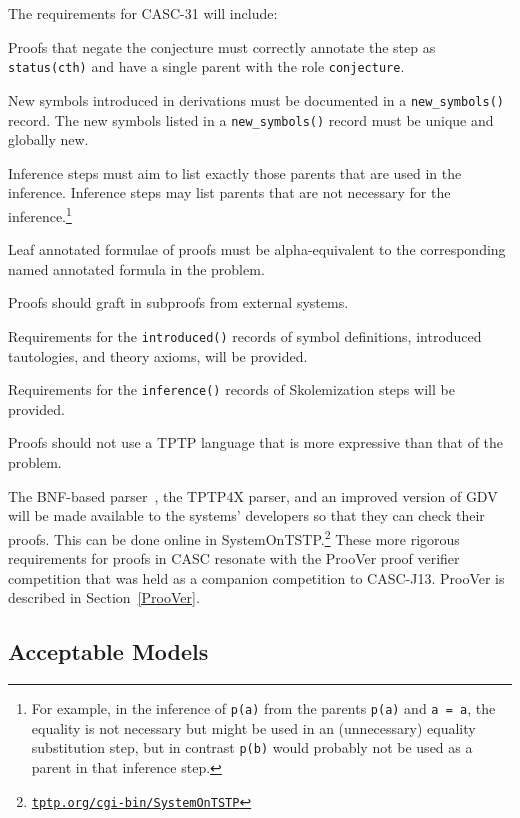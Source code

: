 \documentclass[aic]{iosart2x}
\newcommand{\smalltt}[1]{\small \texttt{#1}}
\newenvironment{packed_enumerate}{
\vspace*{-0.3em}
\begin{enumerate}
  \setlength{\partopsep}{0pt}
  \setlength{\itemsep}{1pt}
  \setlength{\parskip}{0pt}
  \setlength{\parsep}{0pt}
}{\end{enumerate}}
\newcommand{\THIS}{\mbox{CASC-J13}}
\newcommand{\NEXT}{\mbox{CASC-31}}
\begin{document}
The requirements for \NEXT{} will include: 
\begin{packed_enumerate}
\item[9'.] Proofs that negate the conjecture must correctly annotate the step as
      \smalltt{status(cth)} and have a single parent with the role \smalltt{conjecture}.
\item[10'.] New symbols introduced in derivations must be documented in a \smalltt{new\_symbols()}
      record. 
      The new symbols listed in a \smalltt{new\_symbols()} record must be unique and globally new.
\item[11'.] Inference steps must aim to list exactly those parents that are used in the inference. 
      Inference steps may list parents that are not necessary for the inference.\footnote{%
      For example, in the inference of \smalltt{p(a)} from the parents \smalltt{p(a)} and 
      \smalltt{a = a}, the equality is not necessary but might be used in an (unnecessary) 
      equality substitution step, but in contrast \smalltt{p(b)} would probably not be used 
      as a parent in that inference step.}
\item[12.] Leaf annotated formulae of proofs must be alpha-equivalent to the corresponding named
      annotated formula in the problem.
\item[13.] Proofs should graft in subproofs from external systems.
\item[14.] Requirements for the \smalltt{introduced()} records of symbol definitions, 
      introduced tautologies, and theory axioms, will be provided.
\item[15.] Requirements for the \smalltt{inference()} records of Skolemization steps will be 
provided.
\item[16.] Proofs should not use a TPTP language that is more expressive than that of the problem.
\end{packed_enumerate}
The BNF-based parser~\cite{VS06}, the TPTP4X parser, and an improved version of GDV will be 
made available to the systems' developers so that they can check their proofs.
This can be done online in SystemOnTSTP.\footnote{%
\href{https://tptp.org/cgi-bin/SystemOnTSTP}{\tt tptp.org/cgi-bin/SystemOnTSTP}}
These more rigorous requirements for proofs in CASC resonate with the ProoVer proof verifier 
competition that was held as a companion competition to \THIS{}.
ProoVer is described in Section~\ref{ProoVer}.

\subsection{Acceptable Models}
\label{AcceptableModels}
\end{document}
